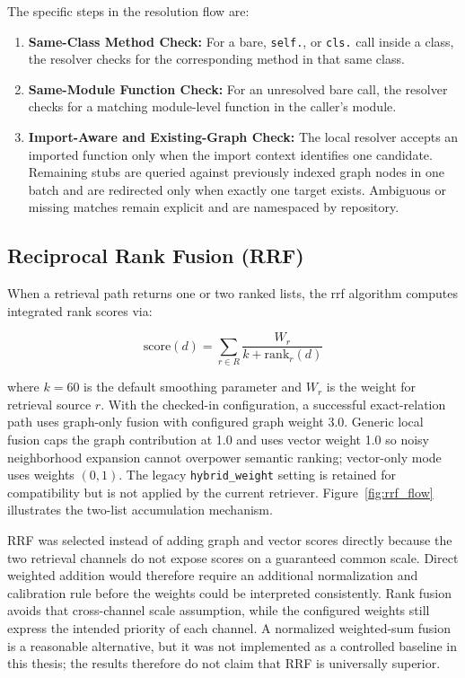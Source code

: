 \documentclass[12pt,letterpaper,oneside]{report}
\begin{document}
The specific steps in the resolution flow are:
\begin{enumerate}
    \item \textbf{Same-Class Method Check:} For a bare, \texttt{self.}, or \texttt{cls.} call inside a class, the resolver checks for the corresponding method in that same class.
    \item \textbf{Same-Module Function Check:} For an unresolved bare call, the resolver checks for a matching module-level function in the caller's module.
    \item \textbf{Import-Aware and Existing-Graph Check:} The local resolver accepts an imported function only when the import context identifies one candidate. Remaining stubs are queried against previously indexed graph nodes in one batch and are redirected only when exactly one target exists. Ambiguous or missing matches remain explicit and are namespaced by repository.
\end{enumerate}

\subsection{Reciprocal Rank Fusion (RRF)}
When a retrieval path returns one or two ranked lists, the \gls{rrf} algorithm \cite{cormack2009rrf} computes integrated rank scores via:

\begin{equation}
    \text{score}(d) = \sum_{r \in R} \frac{W_r}{k + \text{rank}_r(d)}
    \label{eq:rrf}
\end{equation}

where $k = 60$ is the default smoothing parameter and $W_r$ is the weight for retrieval source $r$. With the checked-in configuration, a successful exact-relation path uses graph-only fusion with configured graph weight 3.0. Generic local fusion caps the graph contribution at 1.0 and uses vector weight 1.0 so noisy neighborhood expansion cannot overpower semantic ranking; vector-only mode uses weights $(0,1)$. The legacy \texttt{hybrid\_weight} setting is retained for compatibility but is not applied by the current retriever. Figure~\ref{fig:rrf_flow} illustrates the two-list accumulation mechanism.

RRF was selected instead of adding graph and vector scores directly because the two retrieval channels do not expose scores on a guaranteed common scale. Direct weighted addition would therefore require an additional normalization and calibration rule before the weights could be interpreted consistently. Rank fusion avoids that cross-channel scale assumption, while the configured weights still express the intended priority of each channel. A normalized weighted-sum fusion is a reasonable alternative, but it was not implemented as a controlled baseline in this thesis; the results therefore do not claim that RRF is universally superior.
\end{document}
